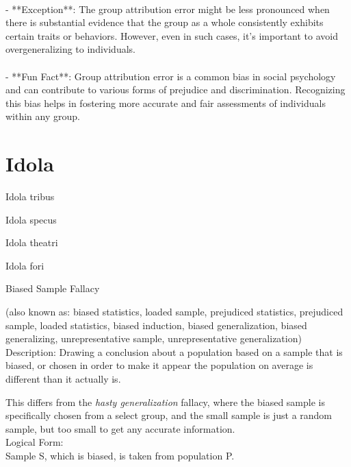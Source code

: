 \documentclass[a4paper,12pt,single,pdftex]{scrbook}
\begin{document}
    
      
    \\

    
      - **Exception**: The group attribution error might be less pronounced when there is substantial evidence that the group as a whole consistently exhibits certain traits or behaviors. However, even in such cases, it’s important to avoid overgeneralizing to individuals.
    \\

    
      
    \\

    
      - **Fun Fact**: Group attribution error is a common bias in social psychology and can contribute to various forms of prejudice and discrimination. Recognizing this bias helps in fostering more accurate and fair assessments of individuals within any group.
    \\

  \section{Idola}


Idola tribus

Idola specus

Idola theatri

Idola fori

Biased Sample Fallacy
    
      (also known as: biased statistics, loaded sample, prejudiced statistics, prejudiced sample, loaded statistics, biased induction, biased generalization, biased generalizing, unrepresentative sample, unrepresentative generalization)
    \\

  
    Description: Drawing a conclusion about a population based on a sample that is biased, or chosen in order to make it appear the population on average is different than it actually is.

    
      This differs from the {\it hasty generalization} fallacy, where the biased sample is specifically chosen from a select group, and the small sample is just a random sample, but too small to get any accurate information.
    \\

    
      Logical Form:
    \\

    
      Sample S, which is biased, is taken from population P.
    \\
\end{document}
